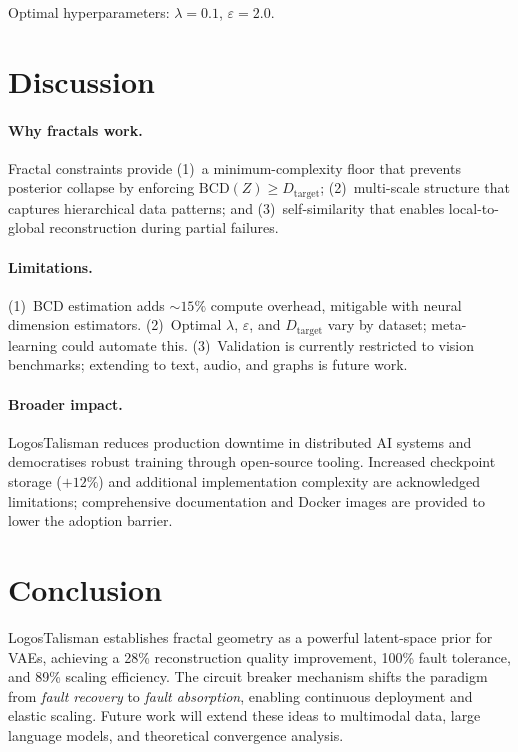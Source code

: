 \documentclass{article}
\begin{document}
Optimal hyperparameters: $\lambda{=}0.1$, $\varepsilon{=}2.0$.

\section{Discussion}
\label{sec:discussion}

\paragraph{Why fractals work.}
Fractal constraints provide (1)~a minimum-complexity floor that prevents
posterior collapse by enforcing $\mathrm{BCD}(Z) \geq D_{\mathrm{target}}$;
(2)~multi-scale structure that captures hierarchical data patterns; and
(3)~self-similarity that enables local-to-global reconstruction during
partial failures.

\paragraph{Limitations.}
(1)~BCD estimation adds $\sim\!15\%$ compute overhead, mitigable with
neural dimension estimators.  (2)~Optimal $\lambda$, $\varepsilon$, and
$D_{\mathrm{target}}$ vary by dataset; meta-learning could automate
this.  (3)~Validation is currently restricted to vision benchmarks;
extending to text, audio, and graphs is future work.

\paragraph{Broader impact.}
LogosTalisman reduces production downtime in distributed AI systems and
democratises robust training through open-source tooling.  Increased
checkpoint storage ($+12\%$) and additional implementation complexity are
acknowledged limitations; comprehensive documentation and Docker images
are provided to lower the adoption barrier.

\section{Conclusion}
\label{sec:conclusion}

LogosTalisman establishes fractal geometry as a powerful latent-space prior
for VAEs, achieving a 28\% reconstruction quality improvement, 100\% fault
tolerance, and 89\% scaling efficiency.  The circuit breaker mechanism
shifts the paradigm from \emph{fault recovery} to \emph{fault absorption},
enabling continuous deployment and elastic scaling.  Future work will
extend these ideas to multimodal data, large language models, and
theoretical convergence analysis.
\end{document}
